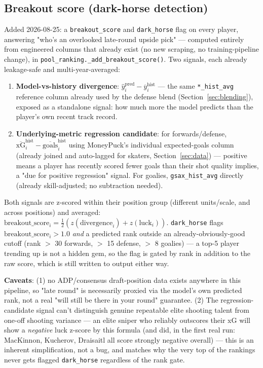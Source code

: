 \documentclass[11pt, a4paper]{article}
\begin{document}
\subsection{Breakout score (dark-horse detection)}
\label{sec:breakout}

Added 2026-08-25: a \texttt{breakout\_score} and \texttt{dark\_horse} flag on every player,
answering "who's an overlooked late-round upside pick" — computed entirely from engineered
columns that already exist (no new scraping, no training-pipeline change), in
\texttt{pool\_ranking.\_add\_breakout\_score()}. Two signals, each already leakage-safe and
multi-year-averaged:

\begin{enumerate}[leftmargin=*]
  \item \textbf{Model-vs-history divergence}: $\hat{y}_i^{\text{pred}} -
        \overline{y}_i^{\text{hist}}$ — the same \texttt{*\_hist\_avg} reference column already
        used by the defense blend (Section~\ref{sec:blending}), exposed as a standalone signal:
        how much more the model predicts than the player's own recent track record.
  \item \textbf{Underlying-metric regression candidate}: for forwards/defense,
        $\overline{\text{xG}}_i^{\text{hist}} - \overline{\text{goals}}_i^{\text{hist}}$ using
        MoneyPuck's individual expected-goals column (already joined and auto-lagged for
        skaters, Section~\ref{sec:data}) — positive means a player has recently scored fewer
        goals than their shot quality implies, a "due for positive regression" signal. For
        goalies, \texttt{gsax\_hist\_avg} directly (already skill-adjusted; no subtraction
        needed).
\end{enumerate}

Both signals are z-scored within their position group (different units/scale, and across
positions) and averaged: $\text{breakout\_score}_i = \tfrac{1}{2}(z(\text{divergence}_i) +
z(\text{luck}_i))$. \texttt{dark\_horse} flags $\text{breakout\_score}_i > 1.0$ \emph{and} a
predicted rank outside an already-obviously-good cutoff (rank $>$ 30 forwards, $>$ 15 defense,
$>$ 8 goalies) — a top-5 player trending up is not a hidden gem, so the flag is gated by rank in
addition to the raw score, which is still written to output either way.

\textbf{Caveats}: (1) no ADP/consensus draft-position data exists anywhere in this pipeline, so
"late round" is necessarily proxied via the model's own predicted rank, not a real
"will still be there in your round" guarantee. (2) The regression-candidate signal can't
distinguish genuine repeatable elite shooting talent from one-off shooting variance — an elite
sniper who reliably outscores their xG will show a \emph{negative} luck z-score by this formula
(and did, in the first real run: MacKinnon, Kucherov, Draisaitl all score strongly negative
overall) — this is an inherent simplification, not a bug, and matches why the very top of the
rankings never gets flagged \texttt{dark\_horse} regardless of the rank gate.
\end{document}
